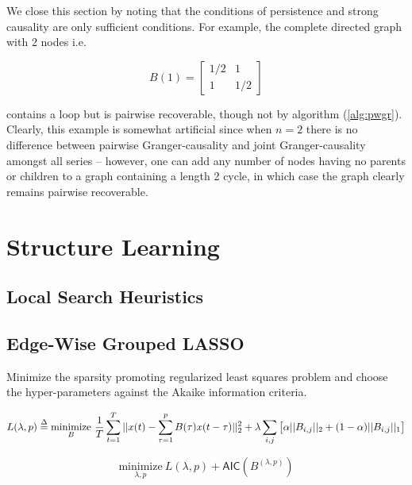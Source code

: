 \documentclass[12pt]{article}
\begin{document}
\begin{example}
  We close this section by noting that the conditions of persistence
  and strong causality are only sufficient conditions.  For example,
  the complete directed graph with 2 nodes i.e.

  \begin{equation*}
    B(1) = \left[ \begin{array}{cc} 1/2 & 1 \\ 1 & 1/2 \end{array}\right]
  \end{equation*}

  contains a loop but is pairwise recoverable, though not by algorithm
  (\ref{alg:pwgr}).  Clearly, this example is somewhat artificial
  since when $n = 2$ there is no difference between pairwise
  Granger-causality and joint Granger-causality amongst all series --
  however, one can add any number of nodes having no parents or
  children to a graph containing a length 2 cycle, in which case the
  graph clearly remains pairwise recoverable.
\end{example}

\section{Structure Learning}
\label{sec:structure_learning}
\subsection{Local Search Heuristics}


\subsection{Edge-Wise Grouped LASSO}
Minimize the sparsity promoting regularized least squares problem and choose the hyper-parameters against the Akaike information criteria.

\begin{equation}
  L(\lambda, p) \overset{\Delta}{=} \underset{B}{\text{minimize}}\ \frac{1}{T}\sum_{t = 1}^T||x(t) - \sum_{\tau = 1}^pB(\tau)x(t - \tau)||_2^2 + \lambda \sum_{i, j}\big[\alpha||B_{i, j}||_2 + (1 - \alpha)||B_{i, j}||_1\big]
\end{equation}

\begin{equation}
  \underset{\lambda, p}{\text{minimize}}\ L(\lambda, p) + \mathsf{AIC}(B^{(\lambda, p)})
\end{equation}
\end{document}
